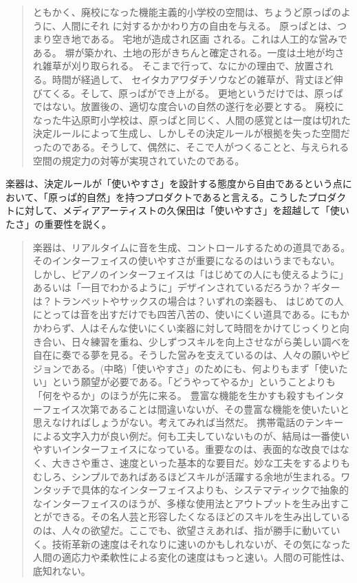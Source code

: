 \begin{quote}
  ともかく、廃校になった機能主義的小学校の空間は、ちょうど原っぱのように、人間にそれ に対するかかわり方の自由を与える。 原っぱとは、つまり空き地である。 宅地が造成され区画 される。これは人工的な営みである。 塀が築かれ、土地の形がきちんと確定される。一度は土地が均され雑草が刈り取られる。 そこまで行って、なにかの理由で、放置される。時間が経過して、 セイタカアワダチソウなどの雑草が、背丈ほど伸びてくる。そして、原っぱができ上がる。 更地というだけでは、原っぱではない。放置後の、適切な度合いの自然の遂行を必要とする。 
  廃校になった牛込原町小学校は、原っぱと同じく、人間の感覚とは一度は切れた決定ルールによって生成し、しかしその決定ルールが根拠を失った空間だったのである。そうして、偶然に、そこで人がつくることと、与えられる空間の規定力の対等が実現されていたのである。  
\end{quote}


楽器は、決定ルールが「使いやすさ」を設計する態度から自由であるという点において、「原っぱ的自然」を持つプロダクトであると言える。こうしたプロダクトに対して、メディアアーティストの久保田は「使いやすさ」を超越して「使いたさ」の重要性を説く。

\begin{quote}
  楽器は、リアルタイムに音を生成、コントロールするための道具である。そのインターフェイスの使いやすさが重要になるのはいうまでもない。 しかし、ピアノのインターフェイスは「はじめての人にも使えるように」あるいは「一目でわかるように」デザインされているだろうか？ギターは？トランペットやサックスの場合は？いずれの楽器も、 はじめての人にとっては音を出すだけでも四苦八苦の、使いにくい道具である。にもかかわらず、人はそんな使いにくい楽器に対して時間をかけてじっくりと向き合い、日々練習を重ね、少しずつスキルを向上させながら美しい調べを自在に奏でる夢を見る。そうした営みを支えているのは、人々の願いやビジョンである。(中略)「使いやすさ」のためにも、何よりもまず「使いたい」という願望が必要である。「どうやってやるか」ということよりも「何をやるか」のほうが先に来る。 豊富な機能を生かすも殺すもインターフェイス次第であることは間違いないが、その豊富な機能を使いたいと思えなければしょうがない。考えてみれば当然だ。 携帯電話のテンキーによる文字入力が良い例だ。何も工夫していないものが、結局は一番使いやすいインターフェイスになっている。重要なのは、表面的な改良ではなく、大きさや重さ、速度といった基本的な要目だ。妙な工夫をするよりもむしろ、シンプルであればあるほどスキルが活躍する余地が生まれる。ワンタッチで具体的なインターフェイスよりも、システマティックで抽象的なインターフェイスのほうが、多様な使用法とアウトプットを生み出すことができる。その名人芸と形容したくなるほどのスキルを生み出しているのは、人々の欲望だ。ここでも、欲望さえあれば、指が勝手に動いていく。技術革新の速度はそれなりに速いのかもしれないが、その気になった人間の適応力や柔軟性による変化の速度はもっと速い。人間の可能性は、底知れない。
\end{quote}

